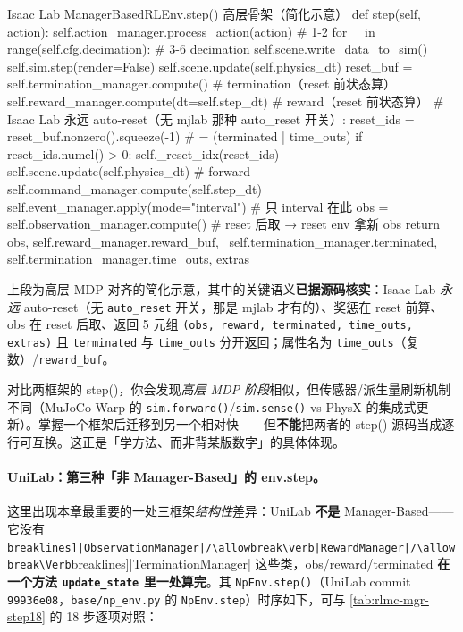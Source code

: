 \begin{codebox}[Python]{Isaac Lab ManagerBasedRLEnv.step() 高层骨架（简化示意）}
def step(self, action):
    self.action_manager.process_action(action)          # 1-2
    for _ in range(self.cfg.decimation):                # 3-6 decimation
        self.scene.write_data_to_sim()
        self.sim.step(render=False)
        self.scene.update(self.physics_dt)
    reset_buf = self.termination_manager.compute()      # termination（reset 前状态算）
    self.reward_manager.compute(dt=self.step_dt)        # reward（reset 前状态算）
    # Isaac Lab 永远 auto-reset（无 mjlab 那种 auto_reset 开关）:
    reset_ids = reset_buf.nonzero().squeeze(-1)         # = (terminated | time_outs)
    if reset_ids.numel() > 0:
        self._reset_idx(reset_ids)
    self.scene.update(self.physics_dt)                   # forward
    self.command_manager.compute(self.step_dt)
    self.event_manager.apply(mode="interval")           # 只 interval 在此
    obs = self.observation_manager.compute()            # reset 后取 → reset env 拿新 obs
    return obs, self.reward_manager.reward_buf, \
        self.termination_manager.terminated, self.termination_manager.time_outs, extras
\end{codebox}

上段为高层 MDP 对齐的简化示意，其中的关键语义\textbf{已据源码核实}：Isaac Lab \emph{永远} auto-reset（无 \texttt{auto\_reset} 开关，那是 mjlab 才有的）、奖惩在 reset 前算、obs 在 reset 后取、返回 5 元组 \texttt{(obs, reward, terminated, time\_outs, extras)} 且 \texttt{terminated} 与 \texttt{time\_outs} 分开返回；属性名为 \texttt{time\_outs}（复数）/\texttt{reward\_buf}。

\begin{insight}[高层对齐 $\ne$ 源码逐行一致]\label{ins:rlmc-mgr-align}
对比两框架的 step()，你会发现\emph{高层 MDP 阶段}相似，但传感器/派生量刷新机制不同（MuJoCo Warp 的 \verb|sim.forward()|/\allowbreak\verb|sim.sense()| vs PhysX 的集成式更新）。掌握一个框架后迁移到另一个相对快——但\textbf{不能}把两者的 step() 源码当成逐行可互换。这正是「学方法、而非背某版数字」的具体体现。
\end{insight}

\paragraph{UniLab：第三种「非 Manager-Based」的 env.step。}这里出现本章最重要的一处三框架\emph{结构性}差异：UniLab \textbf{不是} Manager-Based——它没有 \Verb[breaklines]|ObservationManager|/\allowbreak\verb|RewardManager|/\allowbreak\Verb[breaklines]|TerminationManager| 这些类，obs/reward/terminated \textbf{在一个方法 \texttt{update\_state} 里一处算完}。其 \verb|NpEnv.step()|（UniLab commit \texttt{99936e08}，\texttt{base/\allowbreak np\_env.\allowbreak py} 的 \verb|NpEnv.step|）时序如下，可与 \cref{tab:rlmc-mgr-step18} 的 18 步逐项对照：

